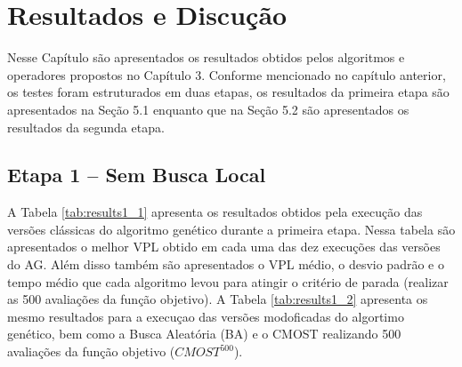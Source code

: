 \chapter{Resultados e Discução}
\label{ch:ch5}
Nesse Capítulo são apresentados os resultados obtidos pelos algoritmos e operadores propostos no Capítulo 3. Conforme mencionado no capítulo anterior, os testes foram estruturados em duas etapas, os resultados da primeira etapa são apresentados na Seção 5.1 enquanto que na Seção 5.2 são apresentados os resultados da segunda etapa.

\section{Etapa 1 – Sem Busca Local}

A Tabela \ref{tab:results1_1} apresenta os resultados obtidos pela execução das versões clássicas do algoritmo genético durante a primeira etapa. Nessa tabela são apresentados o melhor VPL obtido em cada uma das dez execuções das versões do AG. Além disso também são apresentados o VPL médio, o desvio padrão e o tempo médio que cada algoritmo levou para atingir o critério de parada (realizar as 500 avaliações da função objetivo). A Tabela \ref{tab:results1_2} apresenta os mesmo resultados para a execuçao das versões modoficadas do algortimo genético, bem como a Busca Aleatória (BA) e o CMOST realizando 500 avaliações da função objetivo ($CMOST^{500}$).

